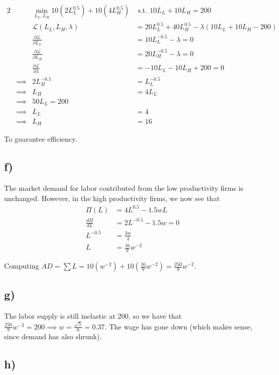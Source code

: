 \documentclass[12pt,letterpaper]{article}
\theoremstyle{definition}
\newcommand{\Lag}{\mathcal{L}}
\begin{document}
\begin{alignat*}{2}
  && \min_{L_L,L_H} 10(2L_L^{0.5}) + 10(4L_H^{0.5}) &\text{ s.t. } 10L_L + 10L_H = 200\\
  && \Lag(L_L,L_H,\lambda) &= 20L_L^{0.5} + 40L_H^{0.5} - \lambda(10L_L + 10L_H - 200)
  \\
  && \frac{\partial \Lag}{\partial L_L} &= 10L_L^{-0.5} - \lambda = 0 \\
  && \frac{\partial \Lag}{\partial L_H} &= 20L_H^{-0.5} - \lambda = 0 \\
  && \frac{\partial \Lag}{\partial \lambda} &= -10L_L - 10L_H + 200 = 0 \\
  &\implies& 2L^{-0.5}_H &= L_L^{-0.5} \\
  &\implies& L_H &= 4L_L \\
  &\implies& 50L_L = 200 \\
  &\implies& L_L&= 4 \\
  &\implies& L_H &= 16
\end{alignat*}

To guarantee efficiency.

\subsection*{f)}

The market demand for labor contributed from the low productivity firms is
unchanged. However, in the high productivity firms, we now see that
\begin{align*}
  \Pi(L) &= 4L^{0.5} - 1.5wL \\
  \frac{d\Pi}{dL} &= 2L^{-0.5} - 1.5w = 0 \\
  L^{-0.5} &= \frac{3w}{4} \\
  L &= \frac{16}{9}w^{-2}
\end{align*}

Computing $AD = \sum L = 10(w^{-2}) + 10(\frac{16}{9}w^{-2}) = \frac{250}{9}w^{-2}$.

\subsection*{g)}

The labor supply is still inelastic at 200, so we have that $\frac{250}{9}w^{-2}
= 200 \implies w = \frac{\sqrt{5}}{6} = 0.37$. The wage has gone down (which
makes sense, since demand has also shrunk).

\subsection*{h)}
\end{document}
